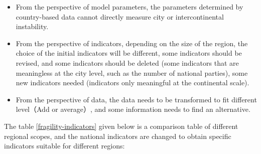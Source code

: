 \documentclass{mcmthesis}
\begin{document}
		\begin{itemize}
			
			\item From the perspective of model parameters, the parameters determined by country-based data cannot directly measure city or intercontinental instability.
			
			\item From the perspective of indicators, depending on the size of the region, the choice of the initial indicators will be different, some indicators should be revised, and some indicators should be deleted (some indicators that are meaningless at the city level, such as the number of national parties), some new indicators needed (indicators only meaningful at the continental scale).
			
			\item From the perspective of data, the data needs to be transformed to fit different level（Add or average）, and some information needs to find an alternative.
			
		\end{itemize}
		
		
		The table \ref{fragility-indicators} given below is a comparison table of different regional scopes, and the national indicators are changed to obtain specific indicators suitable for different regions:
		
\end{document}
